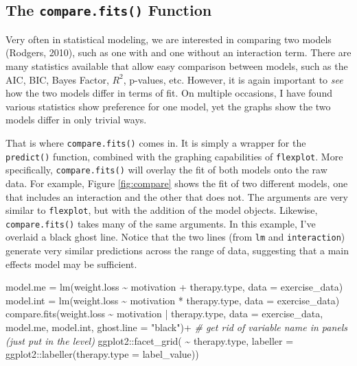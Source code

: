 \documentclass[
  english,
  man]{apa6}
\newenvironment{Shaded}{\begin{snugshade}}{\end{snugshade}}
\newcommand{\AttributeTok}[1]{\textcolor[rgb]{0.77,0.63,0.00}{#1}}
\newcommand{\CommentTok}[1]{\textcolor[rgb]{0.56,0.35,0.01}{\textit{#1}}}
\newcommand{\FunctionTok}[1]{\textcolor[rgb]{0.00,0.00,0.00}{#1}}
\newcommand{\NormalTok}[1]{#1}
\newcommand{\OtherTok}[1]{\textcolor[rgb]{0.56,0.35,0.01}{#1}}
\newcommand{\SpecialCharTok}[1]{\textcolor[rgb]{0.00,0.00,0.00}{#1}}
\newcommand{\StringTok}[1]{\textcolor[rgb]{0.31,0.60,0.02}{#1}}
\begin{document}
\normalsize

\hypertarget{the-compare.fits-function}{%
\subsection{\texorpdfstring{The \texttt{compare.fits()} Function}{The compare.fits() Function}}\label{the-compare.fits-function}}

Very often in statistical modeling, we are interested in comparing two models (Rodgers, 2010), such as one with and one without an interaction term. There are many statistics available that allow easy comparison between models, such as the AIC, BIC, Bayes Factor, \(R^2\), p-values, etc. However, it is again important to \emph{see} how the two models differ in terms of fit. On multiple occasions, I have found various statistics show preference for one model, yet the graphs show the two models differ in only trivial ways.

That is where \texttt{compare.fits()} comes in. It is simply a wrapper for the \texttt{predict()} function, combined with the graphing capabilities of \texttt{flexplot}. More specifically, \texttt{compare.fits()} will overlay the fit of both models onto the raw data. For example, Figure \ref{fig:compare} shows the fit of two different models, one that includes an interaction and the other that does not. The arguments are very similar to \texttt{flexplot}, but with the addition of the model objects. Likewise, \texttt{compare.fits()} takes many of the same arguments. In this example, I've overlaid a black ghost line. Notice that the two lines (from \texttt{lm} and \texttt{interaction}) generate very similar predictions across the range of data, suggesting that a main effects model may be sufficient.

\small

\begin{Shaded}
\begin{Highlighting}[]
\NormalTok{model.me }\OtherTok{=} \FunctionTok{lm}\NormalTok{(weight.loss }\SpecialCharTok{\textasciitilde{}}\NormalTok{ motivation }\SpecialCharTok{+}\NormalTok{ therapy.type, }\AttributeTok{data =}\NormalTok{ exercise\_data)}
\NormalTok{model.int }\OtherTok{=} \FunctionTok{lm}\NormalTok{(weight.loss }\SpecialCharTok{\textasciitilde{}}\NormalTok{ motivation }\SpecialCharTok{*}\NormalTok{ therapy.type, }\AttributeTok{data =}\NormalTok{ exercise\_data)}
\FunctionTok{compare.fits}\NormalTok{(weight.loss }\SpecialCharTok{\textasciitilde{}}\NormalTok{ motivation }\SpecialCharTok{|}\NormalTok{ therapy.type, }
             \AttributeTok{data =}\NormalTok{ exercise\_data, model.me, model.int, }\AttributeTok{ghost.line =} \StringTok{"black"}\NormalTok{)}\SpecialCharTok{+}
  \CommentTok{\# get rid of variable name in panels (just put in the level)}
\NormalTok{      ggplot2}\SpecialCharTok{::}\FunctionTok{facet\_grid}\NormalTok{( }\SpecialCharTok{\textasciitilde{}}\NormalTok{ therapy.type, }
          \AttributeTok{labeller =}\NormalTok{ ggplot2}\SpecialCharTok{::}\FunctionTok{labeller}\NormalTok{(}\AttributeTok{therapy.type =}\NormalTok{ label\_value))}
\end{Highlighting}
\end{Shaded}
\end{document}
